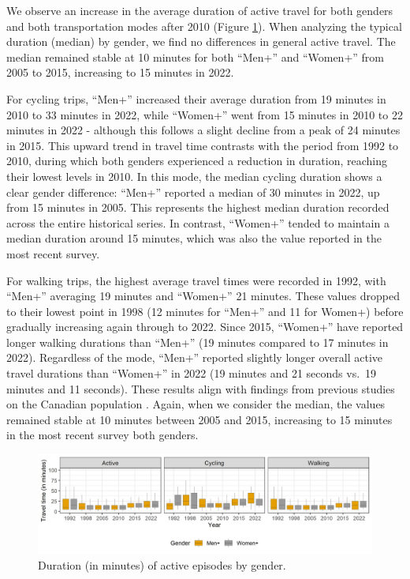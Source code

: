 \documentclass[preprint, 3p,
authoryear]{elsarticle} %
\begin{document}
We observe an increase in the average duration of active travel for both
genders and both transportation modes after 2010 (Figure
\ref{fig:gender-dur-figure}). When analyzing the typical duration
(median) by gender, we find no differences in general active travel. The
median remained stable at 10 minutes for both ``Men+'' and ``Women+''
from 2005 to 2015, increasing to 15 minutes in 2022.

For cycling trips, ``Men+'' increased their average duration from 19
minutes in 2010 to 33 minutes in 2022, while ``Women+'' went from 15
minutes in 2010 to 22 minutes in 2022 - although this follows a slight
decline from a peak of 24 minutes in 2015. This upward trend in travel
time contrasts with the period from 1992 to 2010, during which both
genders experienced a reduction in duration, reaching their lowest
levels in 2010. In this mode, the median cycling duration shows a clear
gender difference: ``Men+'' reported a median of 30 minutes in 2022, up
from 15 minutes in 2005. This represents the highest median duration
recorded across the entire historical series. In contrast, ``Women+''
tended to maintain a median duration around 15 minutes, which was also
the value reported in the most recent survey.

For walking trips, the highest average travel times were recorded in
1992, with ``Men+'' averaging 19 minutes and ``Women+'' 21 minutes.
These values dropped to their lowest point in 1998 (12 minutes for
``Men+'' and 11 for Women+) before gradually increasing again through to
2022. Since 2015, ``Women+'' have reported longer walking durations than
``Men+'' (19 minutes compared to 17 minutes in 2022). Regardless of the
mode, ``Men+'' reported slightly longer overall active travel durations
than ``Women+'' in 2022 (19 minutes and 21 seconds vs.~19 minutes and 11
seconds). These results align with findings from previous studies on the
Canadian population \citep{bryan2009, borhani2024}. Again, when we
consider the median, the values remained stable at 10 minutes between
2005 and 2015, increasing to 15 minutes in the most recent survey both
genders.

\begin{figure}
\includegraphics[width=1\linewidth]{figures/gender_duration_boxplots} \caption{Duration (in minutes) of active episodes by gender.}\label{fig:gender-dur-figure}
\end{figure}
\end{document}
